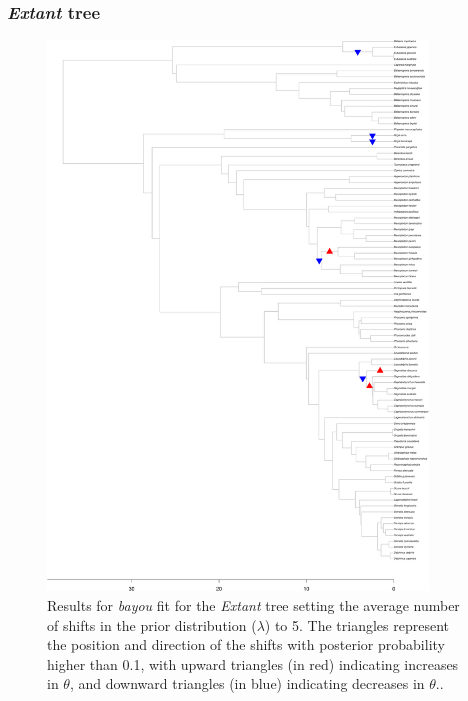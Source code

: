 \subsubsection{\textit{Extant} tree}
\begin{figure}[H]
\includegraphics[width=0.9\textwidth]{img/plots-extant-k5-1.pdf}
\caption{Results for \textit{bayou} fit for the \textit{Extant} tree setting the average number of shifts in the prior distribution ($\lambda$) to 5. The triangles represent the position and direction of the shifts with posterior probability higher than 0.1, with upward triangles (in red) indicating increases in $\theta$, and downward triangles (in blue) indicating decreases in $\theta$..}
\label{fig:extant-k5}
\end{figure}

\newpage

